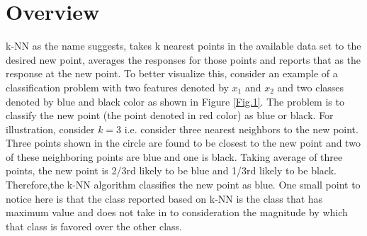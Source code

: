 \documentclass{article}
\begin{document}
\section{Overview} %
k-NN as the name suggests, takes k nearest points in the available data set to the desired new point, averages the responses for those points and reports that as the response at the new point. To better visualize this, consider an example of a classification problem with two features denoted by $x_1$ and $x_2$ and two classes denoted by blue and black color as shown in Figure \ref{Fig.1}. The problem is to classify the new point (the point denoted in red color) as blue or black. For illustration, consider $k = 3$ i.e. consider three nearest neighbors to the new point. Three points shown in the circle are found to be closest to the new point and two of these neighboring points are blue and one is black. Taking average of three points, the new point is 2/3rd likely to be blue and 1/3rd likely to be black. Therefore,the k-NN algorithm classifies the new point as blue. One small point to notice here is that the class reported based on k-NN is the class that has maximum value and does not take in to consideration the magnitude by which that class is favored over the other class.
\end{document}
